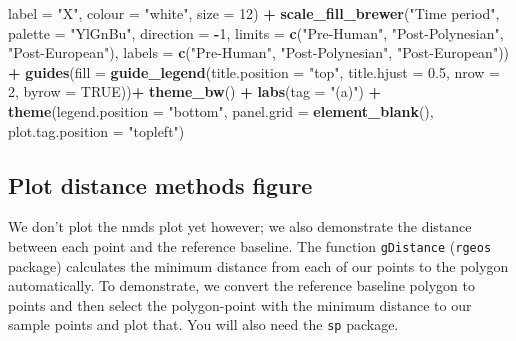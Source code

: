 \documentclass[nofonts,]{tufte-handout}
\newenvironment{Shaded}{\begin{snugshade}}{\end{snugshade}}
\newcommand{\AttributeTok}[1]{\textcolor[rgb]{0.13,0.29,0.53}{#1}}
\newcommand{\ConstantTok}[1]{\textcolor[rgb]{0.56,0.35,0.01}{#1}}
\newcommand{\DecValTok}[1]{\textcolor[rgb]{0.00,0.00,0.81}{#1}}
\newcommand{\FloatTok}[1]{\textcolor[rgb]{0.00,0.00,0.81}{#1}}
\newcommand{\FunctionTok}[1]{\textcolor[rgb]{0.13,0.29,0.53}{\textbf{#1}}}
\newcommand{\NormalTok}[1]{#1}
\newcommand{\SpecialCharTok}[1]{\textcolor[rgb]{0.81,0.36,0.00}{\textbf{#1}}}
\newcommand{\StringTok}[1]{\textcolor[rgb]{0.31,0.60,0.02}{#1}}
\begin{document}
\begin{Shaded}
\begin{Highlighting}[]
            \AttributeTok{label =} \StringTok{"X"}\NormalTok{,}
            \AttributeTok{colour =} \StringTok{"white"}\NormalTok{,}
            \AttributeTok{size =} \DecValTok{12}\NormalTok{) }\SpecialCharTok{+}
  \FunctionTok{scale\_fill\_brewer}\NormalTok{(}\StringTok{"Time period"}\NormalTok{, }
                    \AttributeTok{palette =} \StringTok{"YlGnBu"}\NormalTok{,}
                    \AttributeTok{direction =} \SpecialCharTok{{-}}\DecValTok{1}\NormalTok{,}
                    \AttributeTok{limits =} \FunctionTok{c}\NormalTok{(}\StringTok{"Pre{-}Human"}\NormalTok{, }
                               \StringTok{"Post{-}Polynesian"}\NormalTok{, }
                               \StringTok{"Post{-}European"}\NormalTok{),}
                    \AttributeTok{labels =} \FunctionTok{c}\NormalTok{(}\StringTok{"Pre{-}Human"}\NormalTok{, }
                               \StringTok{"Post{-}Polynesian"}\NormalTok{, }
                               \StringTok{"Post{-}European"}\NormalTok{)) }\SpecialCharTok{+}
  \FunctionTok{guides}\NormalTok{(}\AttributeTok{fill =} \FunctionTok{guide\_legend}\NormalTok{(}\AttributeTok{title.position =} \StringTok{"top"}\NormalTok{,}
                             \AttributeTok{title.hjust =} \FloatTok{0.5}\NormalTok{,}
                             \AttributeTok{nrow =} \DecValTok{2}\NormalTok{, }\AttributeTok{byrow =} \ConstantTok{TRUE}\NormalTok{))}\SpecialCharTok{+}
  \FunctionTok{theme\_bw}\NormalTok{() }\SpecialCharTok{+}
  \FunctionTok{labs}\NormalTok{(}\AttributeTok{tag =} \StringTok{"(a)"}\NormalTok{) }\SpecialCharTok{+}
  \FunctionTok{theme}\NormalTok{(}\AttributeTok{legend.position =} \StringTok{"bottom"}\NormalTok{, }
        \AttributeTok{panel.grid =} \FunctionTok{element\_blank}\NormalTok{(),}
        \AttributeTok{plot.tag.position =} \StringTok{"topleft"}\NormalTok{)}
\end{Highlighting}
\end{Shaded}

\hypertarget{plot-distance-methods-figure}{%
\subsection{Plot distance methods
figure}\label{plot-distance-methods-figure}}

We don't plot the nmds plot yet however; we also demonstrate the
distance between each point and the reference baseline. The function
\texttt{gDistance} (\texttt{rgeos} package) calculates the minimum
distance from each of our points to the polygon automatically. To
demonstrate, we convert the reference baseline polygon to points and
then select the polygon-point with the minimum distance to our sample
points and plot that. You will also need the \texttt{sp} package.
\end{document}

